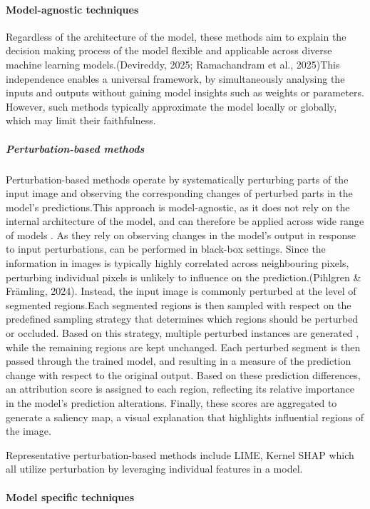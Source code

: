 \paragraph{Model-agnostic techniques }

Regardless of the architecture of the model, these methods aim to explain the decision making process of the model flexible and applicable across diverse machine learning models.(Devireddy, 2025; Ramachandram et al., 2025)This independence enables a universal framework, by simultaneously analysing the inputs and outputs without gaining model insights such as weights or parameters. However, such methods typically approximate the model locally or globally, which may limit their faithfulness.

\subparagraph{Perturbation-based methods }
Perturbation-based methods operate by systematically perturbing parts of the input image and observing the corresponding changes of perturbed parts in the model’s predictions.This approach is model-agnostic, as it does not rely on the internal architecture of the model, and can therefore be applied across wide range of models . As they rely on observing changes in the model’s output in response to input perturbations, can be performed in black-box settings. Since the information in images is typically highly correlated across neighbouring pixels, perturbing individual pixels  is unlikely to influence on the prediction.(Pihlgren \& Främling, 2024). Instead, the input image is commonly perturbed at the level of segmented regions.Each segmented regions is then sampled with respect on the predefined sampling strategy that determines which regions should be perturbed or occluded. Based on this strategy, multiple perturbed instances are generated , while the remaining regions are kept unchanged. Each perturbed segment  is then passed through the trained model, and resulting in a measure of the prediction change with respect to the original output. Based on these prediction differences, an attribution score is assigned to each region, reflecting its relative importance in the model’s prediction alterations. Finally, these scores are aggregated to generate a saliency map, a visual explanation that  highlights influential regions of the image.

Representative perturbation-based methods include LIME, Kernel SHAP which all utilize perturbation by leveraging individual features in a model.


\paragraph{Model specific techniques}

